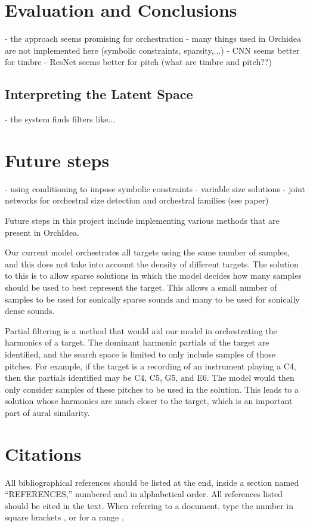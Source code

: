 \documentclass{article}
\begin{document}
\section{Evaluation and Conclusions}
- the approach seems promising for orchestration
- many things used in Orchidea are not implemented here (symbolic constraints, sparsity,...)
- CNN seems better for timbre
- ResNet seems better for pitch (what are timbre and pitch??)

\subsection{Interpreting the Latent Space}
- the system finds filters like...

\section{Future steps}
- using conditioning to impose symbolic constraints
- variable size solutions
- joint networks for orchestral size detection and orchestral families (see paper)

Future steps in this project include implementing various methods that are present in OrchIdea. 

Our current model orchestrates all targets using the same number of samples, and this does not take into account the density of different targets. The solution to this is to allow sparse solutions in which the model decides how many samples should be used to best represent the target. This allows a small number of samples to be used for sonically sparse sounds and many to be used for sonically dense sounds. 

Partial filtering is a method that would aid our model in orchestrating the harmonics of a target. The dominant harmonic partials of the target are identified, and the search space is limited to only include samples of those pitches. For example, if the target is a recording of an instrument playing a C4, then the partials identified may be C4, C5, G5, and E6. The model would then only consider samples of these pitches to be used in the solution. This leads to a solution whose harmonics are much closer to the target, which is an important part of aural similarity.

\section{Citations}

All bibliographical references should be listed at the end,
inside a section named ``REFERENCES,'' numbered and in alphabetical order.
All references listed should be cited in the text.
When referring to a document, type the number in square brackets
\cite{Author:00}, or for a range \cite{Author:00,Someone:10,Someone:04}.
\end{document}
